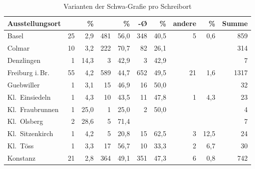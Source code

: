\begin{table}
\caption{Varianten der Schwa-Grafie pro Schreibort}
\smaller
\begin{tabular}{
	l @{\qquad}
	r r @{\qquad}
	r r @{\qquad}
	r r @{\qquad}
	r r @{\qquad}
	r}

\toprule

Ausstellungsort
	& \norm{-i} & \%
	& \norm{-e} & \%
	& -Ø & \%
	& andere & \%
	& Summe
	\\

\midrule

Basel
	& 25	& 2,9
	& 481	& 56,0
	& 348	& 40,5
	& 5		& 0,6
	& 859
	\\

\midrule

Colmar
	& 10	& 3,2
	& 222	& 70,7
	& 82	& 26,1
	& 		&
	& 314
	\\

\midrule

Denzlingen
	& 1 & 14,3
	& 3	& 42,9
	& 3	& 42,9
	& 	&
	& 7
	\\

\midrule

Freiburg i.\,Br.
	& 55	& 4,2
	& 589	& 44,7
	& 652	& 49,5
	& 21	& 1,6
	& 1317
	\\

\midrule

Guebwiller
	& 1		& 3,1
	& 15	& 46,9
	& 16	& 50,0
	& 		&
	& 32
	\\

\midrule

Kl.~Einsiedeln
	& 1		& 4,3
	& 10	& 43,5
	& 11	& 47,8
	& 1		& 4,3
	& 23
	\\

\midrule

Kl.~Fraubrunnen
	& 1	& 25,0
	& 1	& 25,0
	& 2	& 50,0
	&	&
	& 4
	\\

\midrule

Kl.~Olsberg
	& 2	& 28,6
	& 5	& 71,4
	&	&
	&	&
	& 7
	\\

\midrule

Kl.~Sitzenkirch
	& 1		& 4,2
	& 5		& 20,8
	& 15	& 62,5
	& 3		& 12,5
	& 24
	\\

\midrule

Kl.~Töss
	& 1		& 3,3
	& 17	& 56,7
	& 10	& 33,3
	& 2		& 6,7
	& 30
	\\

\midrule

Konstanz
	& 21 	& 2,8
	& 364	& 49,1
	& 351	& 47,3
	& 6		& 0,8
	& 742
	\\


\end{tabular}
\end{table}
